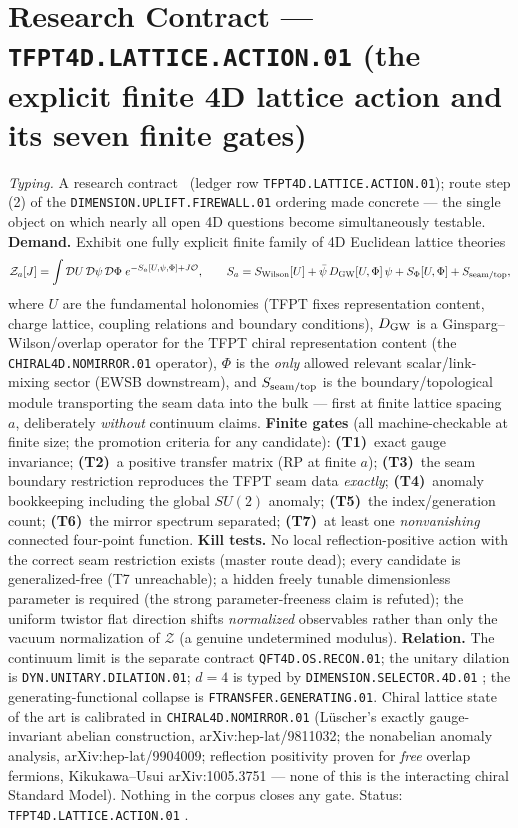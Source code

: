 \section*{Research Contract --- \texttt{TFPT4D.LATTICE.ACTION.01} (the explicit finite 4D lattice action and its seven finite gates)}
\noindent\emph{Typing.} A research contract \mO\ (ledger row \texttt{TFPT4D.LATTICE.ACTION.01});
route step (2) of the \texttt{DIMENSION.UPLIFT.FIREWALL.01} ordering made concrete --- the
single object on which nearly all open 4D questions become simultaneously testable.
\textbf{Demand.}  Exhibit one fully explicit finite family of 4D Euclidean lattice theories
\[
\mathcal Z_a[J]=\int\mathcal DU\,\mathcal D\psi\,\mathcal D\Phi\;
e^{-S_a[U,\psi,\Phi]+J\mathcal O},
\qquad
S_a=S_{\rm Wilson}[U]+\bar\psi\,D_{\rm GW}[U,\Phi]\,\psi+S_\Phi[U,\Phi]+S_{\rm seam/top},
\]
where $U$ are the fundamental holonomies (TFPT fixes representation content, charge lattice,
coupling relations and boundary conditions), $D_{\rm GW}$ is a Ginsparg--Wilson/overlap operator
for the TFPT chiral representation content (the \texttt{CHIRAL4D.NOMIRROR.01} operator), $\Phi$
is the \emph{only} allowed relevant scalar/link-mixing sector (EWSB downstream), and
$S_{\rm seam/top}$ is the boundary/topological module transporting the seam data into the bulk
--- first at finite lattice spacing $a$, deliberately \emph{without} continuum claims.
\textbf{Finite gates} (all machine-checkable at finite size; the promotion criteria for any
candidate): \textbf{(T1)}~exact gauge invariance; \textbf{(T2)}~a positive transfer matrix (RP
at finite $a$); \textbf{(T3)}~the seam boundary restriction reproduces the TFPT seam data
\emph{exactly}; \textbf{(T4)}~anomaly bookkeeping including the global $SU(2)$ anomaly;
\textbf{(T5)}~the index/generation count; \textbf{(T6)}~the mirror spectrum separated;
\textbf{(T7)}~at least one \emph{nonvanishing} connected four-point function.
\textbf{Kill tests.}  No local reflection-positive action with the correct seam restriction
exists (master route dead); every candidate is generalized-free (T7 unreachable); a hidden
freely tunable dimensionless parameter is required (the strong parameter-freeness claim is
refuted); the uniform twistor flat direction shifts \emph{normalized} observables rather than
only the vacuum normalization of $\mathcal Z$ (a genuine undetermined modulus).
\textbf{Relation.}  The continuum limit is the separate contract \texttt{QFT4D.OS.RECON.01};
the unitary dilation is \texttt{DYN.UNITARY.DILATION.01}; $d=4$ is typed by
\texttt{DIMENSION.SELECTOR.4D.01} \mC; the generating-functional collapse is
\texttt{FTRANSFER.GENERATING.01}.  Chiral lattice state of the art is calibrated in
\texttt{CHIRAL4D.NOMIRROR.01} (L\"uscher's exactly gauge-invariant abelian construction,
arXiv:hep-lat/9811032; the nonabelian anomaly analysis, arXiv:hep-lat/9904009; reflection
positivity proven for \emph{free} overlap fermions, Kikukawa--Usui arXiv:1005.3751 --- none of
this is the interacting chiral Standard Model).  Nothing in the corpus closes any gate.
Status: \texttt{TFPT4D.LATTICE.ACTION.01} \mO.

